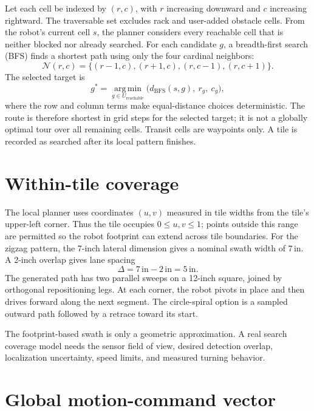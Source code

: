 \documentclass[11pt]{article}
\begin{document}
Let each cell be indexed by $(r,c)$, with $r$ increasing downward and $c$
increasing rightward. The traversable set excludes rack and user-added obstacle
cells. From the robot's current cell $s$, the planner considers every reachable
cell that is neither blocked nor already searched. For each candidate $g$, a
breadth-first search (BFS) finds a shortest path using only the four cardinal
neighbors:
\[
  \mathcal{N}(r,c)=\{(r-1,c),(r+1,c),(r,c-1),(r,c+1)\}.
\]
The selected target is
\[
  g^*=\operatorname*{arg\,min}_{g\in U_{\mathrm{reachable}}}
      \bigl(d_{\mathrm{BFS}}(s,g),\ r_g,\ c_g\bigr),
\]
where the row and column terms make equal-distance choices deterministic.
The route is therefore shortest in grid steps for the selected target; it is
not a globally optimal tour over all remaining cells. Transit cells are
waypoints only. A tile is recorded as searched after its local pattern finishes.

\section{Within-tile coverage}

The local planner uses coordinates $(u,v)$ measured in tile widths from the
tile's upper-left corner. Thus the tile occupies $0\leq u,v\leq1$; points
outside this range are permitted so the robot footprint can extend across tile
boundaries. For the zigzag pattern, the 7-inch lateral dimension gives a
nominal swath width of $7\,\mathrm{in}$. A 2-inch overlap gives lane spacing
\[
  \Delta = 7\,\mathrm{in}-2\,\mathrm{in}=5\,\mathrm{in}.
\]
The generated path has two parallel sweeps on a 12-inch square, joined by
orthogonal repositioning legs. At each corner, the robot pivots in place and
then drives forward along the next segment. The circle-spiral option is a
sampled outward path followed by a retrace toward its start.

The footprint-based swath is only a geometric approximation. A real search
coverage model needs the sensor field of view, desired detection overlap,
localization uncertainty, speed limits, and measured turning behavior.

\section{Global motion-command vector}
\end{document}
